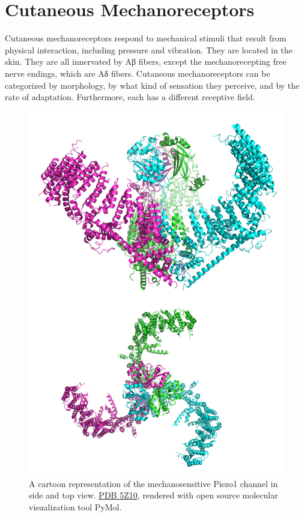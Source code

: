 \hypertarget{cutaneous-mechanoreceptors}{%
\section{Cutaneous Mechanoreceptors}\label{cutaneous-mechanoreceptors}}

Cutaneous mechanoreceptors respond to mechanical stimuli that result from physical interaction, including pressure and vibration. They are located in the skin. They are all innervated by Aβ fibers, except the mechanorecepting free nerve endings, which are Aδ fibers. Cutaneous mechanoreceptors can be categorized by morphology, by what kind of sensation they perceive, and by the rate of adaptation. Furthermore, each has a different receptive field.



\begin{figure}

{\centering \includegraphics[width=0.7\linewidth]{./figures/somatosensory/mechano_sensitive_channel} 

}

\caption{A cartoon representation of the mechanosensitive Piezo1 channel in side and top view. \href{https://www.rcsb.org/structure/5Z10}{PDB 5Z10}, rendered with open source molecular visualization tool PyMol.}\label{fig:mechanosensitive}
\end{figure}

